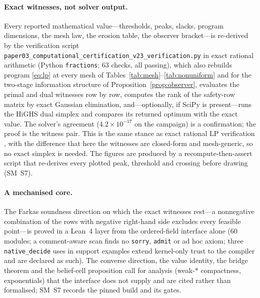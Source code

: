 \documentclass[11pt,a4paper]{article}
\theoremstyle{plain}
\theoremstyle{definition}
\theoremstyle{remark}
\begin{document}
\paragraph{Exact witnesses, not solver output.}
Every reported mathematical value---thresholds, peaks, slacks, program dimensions, the mesh law, the erosion table, the observer bracket---is re-derived by the verification script \texttt{paper03\_computational\_certification\_v23\_verification.py} in exact rational arithmetic (Python \texttt{fractions}; 63 checks, all passing), which also rebuilds program \eqref{eq:lp} at every mesh of Tables~\ref{tab:mesh}--\ref{tab:nonuniform} and for the two-stage information structure of Proposition~\ref{prop:observer}, evaluates the primal and dual witnesses row by row, computes the rank of the safety-row matrix by exact Gaussian elimination, and---optionally, if SciPy is present---runs the HiGHS dual simplex \cite{HuangfuHall2018} and compares its returned optimum with the exact value. The solver's agreement ($4.2\times10^{-17}$ on the campaign) is a confirmation; the proof is the witness pair. This is the same stance as exact rational LP verification \cite{Applegate2007}, with the difference that here the witnesses are closed-form and mesh-generic, so no exact simplex is needed. The figures are produced by a recompute-then-assert script that re-derives every plotted peak, threshold and crossing before drawing (SM~S7).

\paragraph{A mechanised core.}
The Farkas soundness direction on which the exact witnesses rest---a nonnegative combination of the rows with negative right-hand side excludes every feasible point---is proved in a Lean~4 \cite{deMouraUllrich2021} layer from the ordered-field interface alone (60 modules; a comment-aware scan finds no \texttt{sorry}, \texttt{admit} or ad hoc axiom; three \texttt{native\_decide} uses in support examples extend kernel-only trust to the compiler and are declared as such). The converse direction, the value identity, the bridge theorem and the belief-cell proposition call for analysis (weak-$\ast$ compactness, exponentials) that the interface does not supply and are cited rather than formalised; SM~S7 records the pinned build and its gates.
\end{document}
